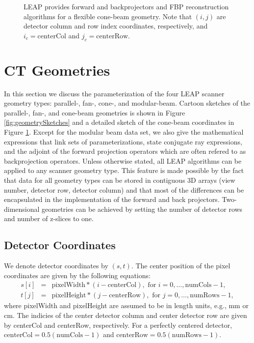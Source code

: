 \documentclass[11pt]{article}
\begin{document}
\begin{figure}[h]

\caption{LEAP provides forward and backprojectors and FBP reconstruction algorithms for a flexible cone-beam geometry.  Note that $(i,j)$ are detector column and row index coordinates, respectively, and $i_c = \text{centerCol}$ and $j_c = \text{centerRow}$.} \label{fig:coneBeamSketch}
\end{figure}

\section{CT Geometries} \label{sec:CTGeometries}

In this section we discuss the parameterization of the four LEAP scanner geometry types: parallel-, fan-, cone-, and modular-beam.  Cartoon sketches of the parallel-, fan-, and cone-beam geometries is shown in Figure \ref{fig:geometrySketches} and a detailed sketch of the cone-beam coordinates in Figure \ref{fig:coneBeamSketch}.  Except for the modular beam data set, we also give the mathematical expressions that link sets of parameterizations, state conjugate ray expressions, and the adjoint of the forward projection operators which are often refered to as backprojection operators.  Unless otherwise stated, all LEAP algorithms can be applied to any scanner geometry type.  This feature is made possible by the fact that data for all geometry types can be stored in contiguous 3D arrays (view number, detector row, detector column) and that most of the differences can be encapsulated in the implementation of the forward and back projectors.  Two-dimensional geometries can be achieved by setting the number of detector rows and number of z-slices to one.

\subsection{Detector Coordinates} \label{sec:DetectorCoordinates}

We denote detector coordinates by $(s,t)$.  The center position of the pixel coordinates are given by the following equations:
\begin{eqnarray*}
s[i] &=& \text{pixelWidth}*(i - \text{centerCol}), \text{ for } i = 0, \dots, \text{numCols}-1, \\
t[j] &=& \text{pixelHeight}*(j - \text{centerRow}), \text{ for } j = 0, \dots, \text{numRows}-1,
\end{eqnarray*}
where pixelWidth and pixelHeight are assumed to be in length units, e.g., mm or cm.  The indicies of the center detector column and center detector row are given by centerCol and centerRow, respectively.  For a perfectly centered detector, $\text{centerCol} = 0.5(\text{numCols}-1)$ and $\text{centerRow} = 0.5(\text{numRows}-1)$.
\end{document}
